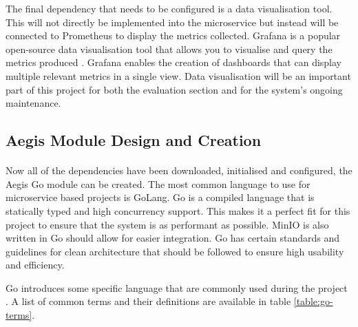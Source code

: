\documentclass[12pt, conference, final, a4paper, onecolumn, compsoc]{IEEEtran}
\begin{document}
The final dependency that needs to be configured is a data visualisation tool.
This will not directly be implemented into the microservice but instead will be
connected to Prometheus to display the metrics collected. Grafana is a popular
open-source data visualisation tool that allows you to visualise and query the
metrics produced \citep{multi-cloud}. Grafana enables the creation of dashboards
that can display multiple relevant metrics in a single view. Data visualisation
will be an important part of this project for both the evaluation section and
for the system's ongoing maintenance.

\subsection{Aegis Module Design and Creation}
\paragraph{}

Now all of the dependencies have been downloaded, initialised and configured,
the Aegis Go module can be created. The most common language to use for
microservice based projects is GoLang. Go is a compiled language that is
statically typed and high concurrency support. This makes it a perfect fit for
this project to ensure that the system is as performant as possible. MinIO is
also written in Go should allow for easier integration. Go has certain standards
and guidelines for clean architecture that should be followed to ensure high
usability and efficiency.

Go introduces some specific language that are commonly used during the project \citep{effective-go}.
A list of common terms and their definitions are available in table
\ref{table:go-terms}.
\end{document}
